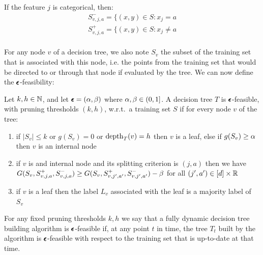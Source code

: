 If the feature $j$ is categorical, then:
\begin{equation}
    \begin{split}
        S^-_{v, j, a} = \{(x, y) \in S : x_j = a\\
        S^+_{v, j, a} = \{(x, y) \in S : x_j \neq a\\
    \end{split}
\end{equation}

For any node $v$ of a decision tree, we also note $S_v$ the subset of the training set that is associated with this node, i.e. the points from the training set that would be directed to or through that node if evaluated by the tree. We can now define the $\pmb{\epsilon}$-feasibility:

\begin{definition}\label{def:eps_feasibility}
Let $k,h \in \mathbb{N}$, and let $\pmb{\epsilon}=(\alpha,\beta)$ where $\alpha,\beta \in (0, 1]$. A decision tree $T$ is $\pmb{\epsilon}$-feasible, with pruning thresholds $(k,h)$, w.r.t.\ a training set $S$ if for every node $v$ of the tree:
\begin{enumerate}
\item if $|S_v| \le k$ or $g(S_v) = 0$ or $\operatorname{depth}_T(v)=h$ then $v$ is a leaf, else if $g(S_v) \ge \alpha$ then $v$ is an internal node
\item if $v$ is and internal node and its splitting criterion is $(j,a)$ then we have $G(S_v,S^+_{v, j, a},S^-_{v, j, a}) \geq G(S_v,S^+_{v, j', a'},S^-_{v, j', a'}) - \beta$ for all $(j',a') \in [d] \times \mathbb{R}$
\item if $v$ is a leaf then the label $L_v$ associated with the leaf is a majority label of $S_v$
\end{enumerate}
\end{definition}
For any fixed pruning thresholds $k,h$ we say that a fully dynamic decision tree building algorithm is $\pmb{\epsilon}$-feasible if, at any point $t$ in time, the tree $T_t$ built by the algorithm is $\pmb{\epsilon}$-feasible with respect to the training set that is up-to-date at that time. 

